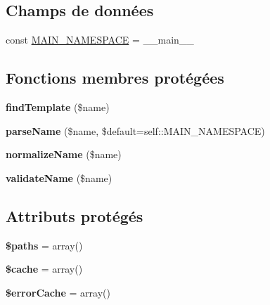 \subsection*{Champs de données}
\begin{DoxyCompactItemize}
\item 
const \hyperlink{class_twig___loader___filesystem_af41bf3185112b600125464a5972ecf38}{M\+A\+I\+N\+\_\+\+N\+A\+M\+E\+S\+P\+A\+CE} = \textquotesingle{}\+\_\+\+\_\+main\+\_\+\+\_\+\textquotesingle{}
\end{DoxyCompactItemize}
\subsection*{Fonctions membres protégées}
\begin{DoxyCompactItemize}
\item 
{\bfseries find\+Template} (\$name)\hypertarget{class_twig___loader___filesystem_a7e542943cb0ed5976c2ae6052254af6b}{}\label{class_twig___loader___filesystem_a7e542943cb0ed5976c2ae6052254af6b}

\item 
{\bfseries parse\+Name} (\$name, \$default=self\+::\+M\+A\+I\+N\+\_\+\+N\+A\+M\+E\+S\+P\+A\+CE)\hypertarget{class_twig___loader___filesystem_ad069239b3add1abec2c37e1b1f51cc5d}{}\label{class_twig___loader___filesystem_ad069239b3add1abec2c37e1b1f51cc5d}

\item 
{\bfseries normalize\+Name} (\$name)\hypertarget{class_twig___loader___filesystem_a565b09107e424878dd2adaa4231ad84d}{}\label{class_twig___loader___filesystem_a565b09107e424878dd2adaa4231ad84d}

\item 
{\bfseries validate\+Name} (\$name)\hypertarget{class_twig___loader___filesystem_a37f7944f8c6847126c5ef65e189f84b3}{}\label{class_twig___loader___filesystem_a37f7944f8c6847126c5ef65e189f84b3}

\end{DoxyCompactItemize}
\subsection*{Attributs protégés}
\begin{DoxyCompactItemize}
\item 
{\bfseries \$paths} = array()\hypertarget{class_twig___loader___filesystem_a20dd412769e0754189f5ce036e857a37}{}\label{class_twig___loader___filesystem_a20dd412769e0754189f5ce036e857a37}

\item 
{\bfseries \$cache} = array()\hypertarget{class_twig___loader___filesystem_ac2dc76d756ec398393d4b1d23659276c}{}\label{class_twig___loader___filesystem_ac2dc76d756ec398393d4b1d23659276c}

\item 
{\bfseries \$error\+Cache} = array()\hypertarget{class_twig___loader___filesystem_a554e9968e4e0a63d2b099393132f0796}{}\label{class_twig___loader___filesystem_a554e9968e4e0a63d2b099393132f0796}

\end{DoxyCompactItemize}


